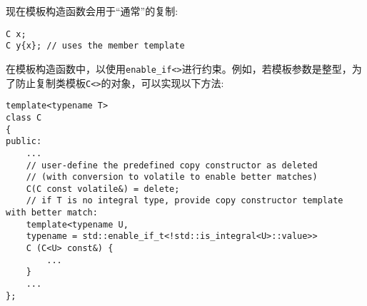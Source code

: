 现在模板构造函数会用于“通常”的复制:

\begin{lstlisting}[style=styleCXX]
C x;
C y{x}; // uses the member template
\end{lstlisting}

在模板构造函数中，以使用\texttt{enable\_if<>}进行约束。例如，若模板参数是整型，为了防止复制类模板\texttt{C<>}的对象，可以实现以下方法:

\begin{lstlisting}[style=styleCXX]
template<typename T>
class C
{
public:
	...
	// user-define the predefined copy constructor as deleted
	// (with conversion to volatile to enable better matches)
	C(C const volatile&) = delete;
	// if T is no integral type, provide copy constructor template with better match:
	template<typename U,
	typename = std::enable_if_t<!std::is_integral<U>::value>>
	C (C<U> const&) {
		...
	}
	...
};
\end{lstlisting}












